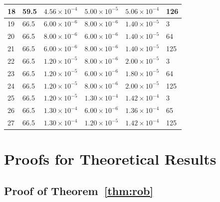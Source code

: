 \documentclass[pmlr]{jmlr} %
\begin{document}
\begin{table}[htbp]
\begin{tabular}{llllll}
    18 & 59.5 & $4.56\times10^{-4}$ & $5.00\times10^{-5}$ & $5.06\times10^{-4}$ & 126 \\
    \midrule
    19 & 66.5 & $6.00\times10^{-6}$ & $8.00\times10^{-6}$ & $1.40\times10^{-5}$ &   3 \\
    20 & 66.5 & $8.00\times10^{-6}$ & $6.00\times10^{-6}$ & $1.40\times10^{-5}$ &  64 \\
    21 & 66.5 & $6.00\times10^{-6}$ & $8.00\times10^{-6}$ & $1.40\times10^{-5}$ & 125 \\
    22 & 66.5 & $1.20\times10^{-5}$ & $8.00\times10^{-6}$ & $2.00\times10^{-5}$ &   3 \\
    23 & 66.5 & $1.20\times10^{-5}$ & $6.00\times10^{-6}$ & $1.80\times10^{-5}$ &  64 \\
    24 & 66.5 & $1.20\times10^{-5}$ & $8.00\times10^{-6}$ & $2.00\times10^{-5}$ & 125 \\
    25 & 66.5 & $1.20\times10^{-5}$ & $1.30\times10^{-4}$ & $1.42\times10^{-4}$ &   3 \\
    26 & 66.5 & $1.30\times10^{-4}$ & $6.00\times10^{-6}$ & $1.36\times10^{-4}$ &  65 \\
    27 & 66.5 & $1.30\times10^{-4}$ & $1.20\times10^{-5}$ & $1.42\times10^{-4}$ & 125 \\
    \bottomrule
  \end{tabular}
\end{table}

\section{Proofs for Theoretical Results}
\label{app:proofs}


\subsection{Proof of Theorem~\ref{thm:rob}}
\end{document}
